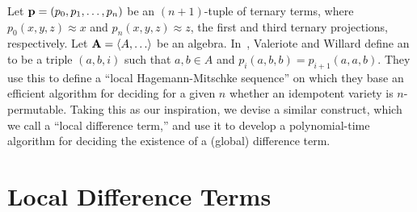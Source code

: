 

Let $\mathbf{p} = (p_0, p_1, \dots, p_n)$ be an $(n+1)$-tuple of ternary terms, where
$p_0(x,y,z) \approx x$ and $p_n(x,y,z) \approx z$, the first and third
ternary projections, respectively. 
Let $\bA=\< A, \dots\>$ be an algebra.
In~\cite{MR3239624},
Valeriote and Willard define an 
to be a triple $(a,b,i)$ such that $a, b \in A$ and
$p_i(a,b,b) = p_{i+1}(a,a,b)$. They use this to define 
a ``local Hagemann-Mitschke sequence'' on which they base an efficient algorithm
for deciding for a given $n$ whether an idempotent variety is $n$-permutable.
Taking this as our inspiration, we devise a similar construct, which we call
a ``local difference term,'' and use it to develop a polynomial-time
algorithm for deciding the existence of a (global) difference term.



\section{Local Difference Terms}




%
%



